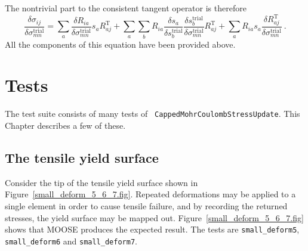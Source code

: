 \documentclass[]{scrreprt}
\begin{document}
The nontrivial part to the consistent tangent operator is therefore
\begin{equation}
  \frac{\delta \sigma_{ij}}{\delta\sigma_{mn}^{\mathrm{trial}}} =
\sum_{a}  \frac{\delta
    R_{ia}}{\delta\sigma_{mn}^{\mathrm{trial}}}s_{a}R_{aj}^{\mathrm{T}}
  + \sum_{a}\sum_{b} R_{ia}\frac{\delta s_{a}}{\delta s_{b}^{\mathrm{trial}}}
  \frac{\delta s_{b}^{\mathrm{trial}}}{\delta
    \sigma_{mn}^{\mathrm{trial}}}R_{aj}^{\mathrm{T}} +
  \sum_{a} R_{ia}s_{a}\frac{\delta
    R_{aj}^{\mathrm{T}}}{\delta\sigma_{mn}^{\mathrm{trial}}} \ .
\end{equation}
All the components of this equation have been provided above.


\chapter{Tests}

The test suite consists of many tests of {\tt
  CappedMohrCoulombStressUpdate}.  This Chapter describes a few of
these.

\section{The tensile yield surface}

Consider the tip of the tensile yield surface shown in
Figure~\ref{small_deform_5_6_7.fig}.  Repeated deformations may be
applied to a single element in order to cause tensile failure, and by
recording the returned stresses, the yield surface may be mapped out.
Figure~\ref{small_deform_5_6_7.fig} shows that MOOSE produces the
expected result.  The tests are {\tt small\_deform5}, {\tt
  small\_deform6} and {\tt small\_deform7}.
\end{document}
